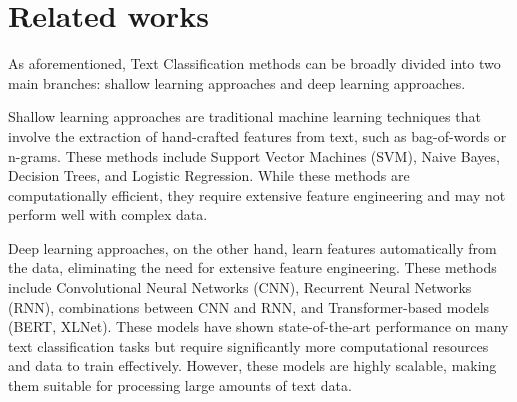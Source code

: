\section{Related works}
As aforementioned, Text Classification methods can be broadly divided into two main branches: shallow learning approaches and deep learning approaches.

Shallow learning approaches are traditional machine learning techniques that involve the extraction of hand-crafted features from text, such as bag-of-words or n-grams. These methods include Support Vector Machines (SVM)\cite{cortesvapnik1995, boser1992}, Naive Bayes\cite{Xu2017}, Decision Trees\cite{Safavian1991}, and Logistic Regression\cite{Genkin2007, Krishnapuram2005}. While these methods are computationally efficient, they require extensive feature engineering and may not perform well with complex data.

Deep learning approaches, on the other hand, learn features automatically from the data, eliminating the need for extensive feature engineering. These methods include Convolutional Neural Networks (CNN)\cite{Kim2014}, Recurrent Neural Networks (RNN)\cite{Cho2014, Sutskever2014}, combinations between CNN and RNN\cite{Vo2017}, and Transformer-based models (BERT\cite{DevlinCLT19}, XLNet\cite{Yang2019}). These models have shown state-of-the-art performance on many text classification tasks but require significantly more computational resources and data to train effectively. However, these models are highly scalable, making them suitable for processing large amounts of text data.